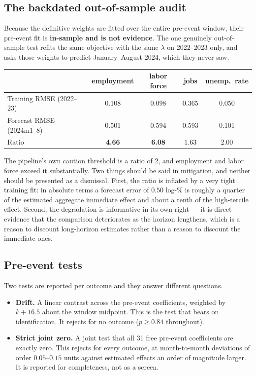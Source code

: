 \documentclass[11pt,a4paper]{article}
\newcommand{\caution}[2]{\begin{tcolorbox}[warnbox,title={#1}]#2\end{tcolorbox}}
\begin{document}
\subsection{The backdated out-of-sample audit}

Because the definitive weights are fitted over the entire pre-event window,
their pre-event fit is \textbf{in-sample and is not evidence}. The one genuinely
out-of-sample test refits the same objective with the same $\lambda$ on
2022--2023 only, and asks those weights to predict January--August 2024, which
they never saw.

\begin{center}
\small
\begin{tabular}{@{}lcccc@{}}
\toprule
& employment & labor force & jobs & unemp.\ rate \\
\midrule
Training RMSE (2022--23) & 0.108 & 0.098 & 0.365 & 0.050 \\
Forecast RMSE (2024m1--8) & 0.501 & 0.594 & 0.593 & 0.101 \\
Ratio & \textbf{4.66} & \textbf{6.08} & 1.63 & 2.00 \\
\bottomrule
\end{tabular}
\end{center}

\caution{This is the weakest result in the project and should be reported as such}{%
The pipeline's own caution threshold is a ratio of $2$, and employment and
labor force exceed it substantially. Two things should be said in mitigation,
and neither should be presented as a dismissal. First, the ratio is inflated by
a very tight training fit: in absolute terms a forecast error of $0.50$ log-\%
is roughly a quarter of the estimated aggregate immediate effect and about a
tenth of the high-tercile effect. Second, the degradation is informative in its
own right --- it is direct evidence that the comparison deteriorates as the
horizon lengthens, which is a reason to discount long-horizon estimates rather
than a reason to discount the immediate ones.}

\subsection{Pre-event tests}

Two tests are reported per outcome and they answer different questions.

\begin{itemize}[leftmargin=1.3em,itemsep=2pt]
\item \textbf{Drift.} A linear contrast across the pre-event coefficients,
      weighted by $k+16.5$ about the window midpoint. This is the test that
      bears on identification. It rejects for no outcome
      ($p \ge 0.84$ throughout).
\item \textbf{Strict joint zero.} A joint test that all 31 free pre-event
      coefficients are exactly zero. This rejects for every outcome, at
      month-to-month deviations of order $0.05$--$0.15$ units against
      estimated effects an order of magnitude larger. It is reported for
      completeness, not as a screen.
\end{itemize}
\end{document}
